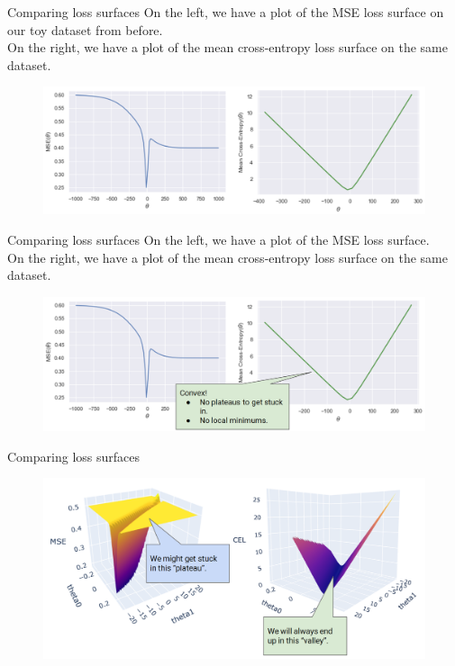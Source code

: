 \documentclass[aspectratio=169]{../latex_main/tntbeamer}  %
\begin{document}
	
	\begin{frame}{Comparing loss surfaces}
	  On the left, we have a plot of the MSE loss surface on our toy dataset from before.\\ On the right, we have a plot of the mean cross-entropy loss surface on the same dataset. 

	    \begin{figure}
	        \centering
	        \includegraphics[scale=.35]{Bild21}
	    \end{figure}
	\end{frame}
	
	
	\begin{frame}{Comparing loss surfaces}
	  On the left, we have a plot of the MSE loss surface.\\ On the right, we have a plot of the mean cross-entropy loss surface on the same dataset. 

	    \begin{figure}
	        \centering
	        \includegraphics[scale=.35]{Bild22}
	    \end{figure}
	\end{frame}
	
	
	\begin{frame}{Comparing loss surfaces}
	    \begin{figure}
	        \centering
	        \includegraphics[scale=.35]{Bild23}
	    \end{figure}
	\end{frame}
	
\end{document}

